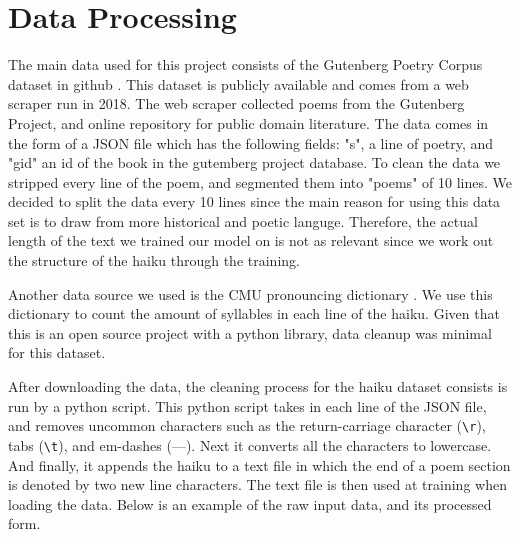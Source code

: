 \documentclass{article} %
\begin{document}
\section{Data Processing}
The main data used for this project consists of the Gutenberg Poetry Corpus dataset in
github \citep{gutenberg_dataset}.
This dataset is publicly available and comes from a web scraper run in 2018.
The web scraper collected poems from the Gutenberg Project, and online repository for public domain literature.
The data comes in the form of a JSON file which has the following fields:
"s", a line of poetry, and "gid" an id of the book in the gutemberg project database.
To clean the data we stripped every line of the poem, and segmented them into "poems" of 10 lines.
We decided to split the data every 10 lines since the main reason for using this data set is to draw from more historical and poetic languge.
Therefore, the actual length of the text we trained our model on is not as relevant since we work out the structure of the haiku through the training.

Another data source we used is the CMU pronouncing dictionary \citep{cmu_pronouncing_dictionary}.
We use this dictionary to count the amount of syllables in each line of the haiku.
Given that this is an open source project with a python library, data cleanup was minimal for this dataset.


After downloading the data, the cleaning process for the haiku dataset consists is run by a python script.
This python script takes in each line of the JSON file, and removes uncommon characters such as the return-carriage character (\texttt{\textbackslash r}), tabs (\texttt{\textbackslash t}), and em-dashes (—).
Next it converts all the characters to lowercase.
And finally, it appends the haiku to a text file in which the end of a poem section is denoted by two new line characters.
The text file is then used at training when loading the data.
Below is an example of the raw input data, and its processed form.
\end{document}
